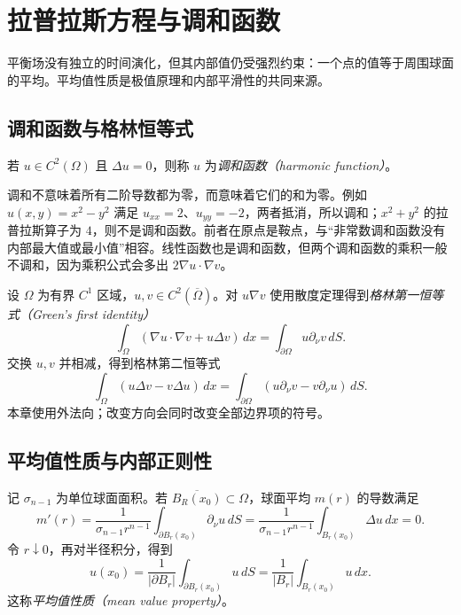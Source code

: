 \setcounter{chapter}{9} %
\chapter{拉普拉斯方程与调和函数}
\label{chap:harmonic}

平衡场没有独立的时间演化，但其内部值仍受强烈约束：一个点的值等于周围球面的平均。平均值性质是极值原理和内部平滑性的共同来源。

\section{调和函数与格林恒等式}
\begin{definition}
若 $u\in C^2(\Omega)$ 且 $\Delta u=0$，则称 $u$ 为\emph{调和函数（harmonic function）}。
\end{definition}
调和不意味着所有二阶导数都为零，而意味着它们的和为零。例如 $u(x,y)=x^2-y^2$ 满足 $u_{xx}=2$、$u_{yy}=-2$，两者抵消，所以调和；$x^2+y^2$ 的拉普拉斯算子为 $4$，则不是调和函数。前者在原点是鞍点，与“非常数调和函数没有内部最大值或最小值”相容。线性函数也是调和函数，但两个调和函数的乘积一般不调和，因为乘积公式会多出 $2\nabla u\cdot\nabla v$。

设 $\Omega$ 为有界 $C^1$ 区域，$u,v\in C^2(\overline\Omega)$。对 $u\nabla v$ 使用散度定理得到\emph{格林第一恒等式（Green's first identity）}
\begin{equation}
 \int_\Omega(\nabla u\cdot\nabla v+u\Delta v)\,dx
 =\int_{\partial\Omega}u\partial_\nu v\,dS.
 \label{eq:green-first}
\end{equation}
交换 $u,v$ 并相减，得到格林第二恒等式
\begin{equation}
 \int_\Omega(u\Delta v-v\Delta u)\,dx
 =\int_{\partial\Omega}(u\partial_\nu v-v\partial_\nu u)\,dS.
 \label{eq:green-second}
\end{equation}
本章使用外法向；改变方向会同时改变全部边界项的符号。

\section{平均值性质与内部正则性}
记 $\sigma_{n-1}$ 为单位球面面积。若 $\overline{B_R(x_0)}\subset\Omega$，球面平均 $m(r)$ 的导数满足
\[
 m'(r)=\frac1{\sigma_{n-1}r^{n-1}}\int_{\partial B_r(x_0)}\partial_\nu u\,dS
 =\frac1{\sigma_{n-1}r^{n-1}}\int_{B_r(x_0)}\Delta u\,dx=0.
\]
令 $r\downarrow0$，再对半径积分，得到
\begin{equation}
 u(x_0)=\frac1{|\partial B_r|}\int_{\partial B_r(x_0)}u\,dS
       =\frac1{|B_r|}\int_{B_r(x_0)}u\,dx.
 \label{eq:harmonic-mean}
\end{equation}
这称\emph{平均值性质（mean value property）}。

